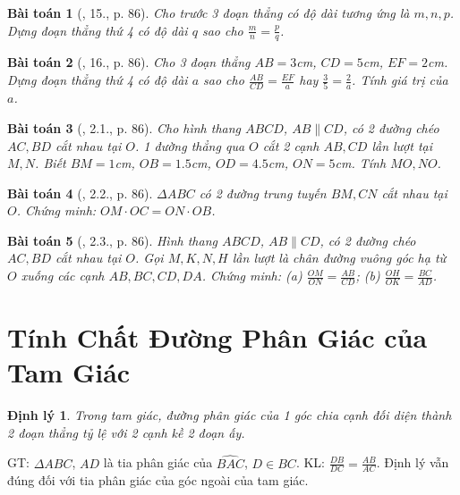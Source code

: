 \documentclass{article}
\newtheorem{baitoan}{Bài toán}
\newtheorem{dinhly}{Định lý}
\begin{document}
\begin{baitoan}[\cite{SBT_Toan_8_tap_2}, 15., p. 86]
	Cho trước 3 đoạn thẳng có độ dài tương ứng là $m,n,p$. Dựng đoạn thẳng thứ 4 có độ dài $q$ sao cho $\frac{m}{n} = \frac{p}{q}$.
\end{baitoan}

\begin{baitoan}[\cite{SBT_Toan_8_tap_2}, 16., p. 86]
	Cho 3 đoạn thẳng $AB = 3$\emph{cm}, $CD = 5$\emph{cm}, $EF = 2$\emph{cm}. Dựng đoạn thẳng thứ 4 có độ dài $a$ sao cho $\frac{AB}{CD} = \frac{EF}{a}$ hay $\frac{3}{5} = \frac{2}{a}$. Tính giá trị của $a$.
\end{baitoan}

\begin{baitoan}[\cite{SBT_Toan_8_tap_2}, 2.1., p. 86]
	Cho hình thang $ABCD$, $AB\parallel CD$, có 2 đường chéo $AC,BD$ cắt nhau tại $O$. 1 đường thẳng qua $O$ cắt 2 cạnh $AB,CD$ lần lượt tại $M,N$. Biết $BM = 1$\emph{cm}, $OB = 1.5$\emph{cm}, $OD = 4.5$\emph{cm}, $ON = 5$\emph{cm}. Tính $MO,NO$.
\end{baitoan}

\begin{baitoan}[\cite{SBT_Toan_8_tap_2}, 2.2., p. 86]
	$\Delta ABC$ có 2 đường trung tuyến $BM,CN$ cắt nhau tại $O$. Chứng minh: $OM\cdot OC = ON\cdot OB$.
\end{baitoan}

\begin{baitoan}[\cite{SBT_Toan_8_tap_2}, 2.3., p. 86]
	Hình thang $ABCD$, $AB\parallel CD$, có 2 đường chéo $AC,BD$ cắt nhau tại $O$. Gọi $M,K,N,H$ lần lượt là chân đường vuông góc hạ từ $O$ xuống các cạnh $AB,BC,CD,DA$. Chứng minh: (a) $\frac{OM}{ON} = \frac{AB}{CD}$; (b) $\frac{OH}{OK} = \frac{BC}{AD}$.
\end{baitoan}


\section{Tính Chất Đường Phân Giác của Tam Giác}

\begin{dinhly}
	Trong tam giác, đường phân giác của 1 góc chia cạnh đối diện thành 2 đoạn thẳng tỷ lệ với 2 cạnh kề 2 đoạn ấy.
\end{dinhly}
GT: $\Delta ABC$, $AD$ là tia phân giác của $\widehat{BAC}$, $D\in BC$. KL: $\frac{DB}{DC} = \frac{AB}{AC}$. Định lý vẫn đúng đối với tia phân giác của  góc ngoài của tam giác.
\end{document}
